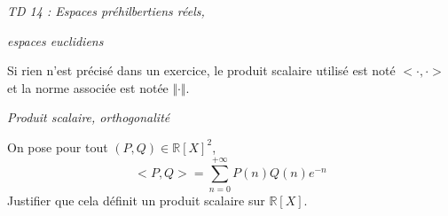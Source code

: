 \documentclass[a4paper,10pt]{report}
\begin{document}
\everymath{\displaystyle}


\begin{center}
\textit{{ {\huge TD 14 : Espaces préhilbertiens réels, }}}

\textit{{ {\huge espaces euclidiens}}}
\end{center}

\bigskip

\noindent Si rien n'est précisé dans un exercice, le produit scalaire utilisé est noté $< \cdot , \cdot >$ et la norme associée est notée $\Vert \cdot \Vert$.


\medskip

\begin{center}
\textit{{ {\large Produit scalaire, orthogonalité}}}
\end{center}

\medskip

\begin{Exa} On pose pour tout $(P,Q) \in \mathbb{R}[X]^2$,
$$ <P,Q> = \sum_{n=0}^{+ \infty} P(n) Q(n) e^{-n} $$
Justifier que cela définit un produit scalaire sur $\mathbb{R}[X]$.
\end{Exa}

%
%
%
\end{document}
